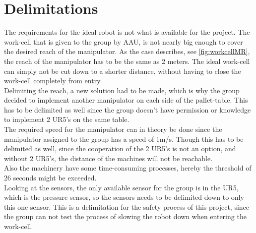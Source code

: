 \chapter{Delimitations} \label{ch:Delimitations}

The requirements for the ideal robot is not what is available for the project. 
The work-cell that is given to the group by AAU, is not nearly big enough to cover the desired reach of the manipulator. As the case describes, see \ref{fig:workcellMR}, the reach of the manipulator has to be the same as 2 meters. The ideal work-cell can simply not be cut down to a shorter distance, without having to close the work-cell completely from entry.\\
Delimiting the reach, a new solution had to be made, which is why the group decided to implement another manipulator on each side of the pallet-table. This has to be delimited as well since the group doesn't have permission or knowledge to implement 2 UR5's on the same table.\\
The required speed for the manipulator can in theory be done since the manipulator assigned to the group has a speed of 1m/s. Though this has to be delimited as well, since the cooperation of the 2 UR5's is not an option, and without 2 UR5's, the distance of the machines will not be reachable.\\
Also the machinery have some time-consuming processes, hereby the threshold of 26 seconds might be exceeded.\\
Looking at the sensors, the only available sensor for the group is in the UR5, which is the pressure sensor, so the sensors needs to be delimited down to only this one sensor. This is a delimitation for the safety process of this project, since the group can not test the process of slowing the robot down when entering the work-cell.\\
